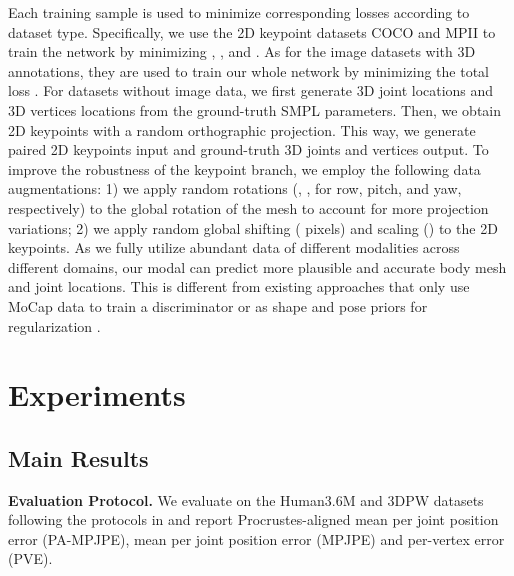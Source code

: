 \documentclass{article}
\newcommand\mypara[1]{\noindent\textbf{#1}}
\begin{document}
Each training sample is used to minimize corresponding losses according to dataset type. Specifically, we use the 2D keypoint datasets COCO and MPII to train the network by minimizing , ,  and . As for the image datasets with 3D annotations, they are used to train our whole network by minimizing the total loss . 
For datasets without image data, we first generate 3D joint locations  and 3D vertices locations  from the ground-truth SMPL parameters. Then, we obtain 2D keypoints  with a random orthographic projection. This way, we generate paired 2D keypoints input and ground-truth 3D joints and vertices output.
To improve the robustness of the keypoint branch, we employ the following data augmentations: 
1) we apply random rotations (, ,  for row, pitch, and yaw, respectively) to the global rotation of the mesh to account for more projection variations; 
2) we apply random global shifting ( pixels) and scaling () to the 2D keypoints. 
As we fully utilize abundant data of different modalities across different domains, our modal can predict more plausible and accurate body mesh and joint locations. This is different from existing approaches that only use MoCap data to train a discriminator  \cite{kanazawa2018endtoend,kocabas2019vibe} or as shape and pose priors for regularization \cite{bogo2016keep}.

\section{Experiments}

\subsection{Main Results}
\label{sec:evaluation}

\mypara{Evaluation Protocol.}
\label{sec:Protocol}
We evaluate on the Human3.6M and 3DPW datasets following the protocols in \cite{kanazawa2018endtoend,kolotouros2019learning} and report Procrustes-aligned mean per joint position error (PA-MPJPE), mean per joint position error (MPJPE) and per-vertex error (PVE).
\end{document}

